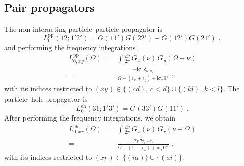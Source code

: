 \documentclass[aip,jcp,reprint,noshowkeys,superscriptaddress]{revtex4-1}
\newcommand{\eps}{\epsilon}
\newcommand{\ii}{\mathrm{i}}
\newcommand{\eh}{\text{eh}}
\newcommand{\pp}{\text{pp}}
\begin{document}
\subsection{Pair propagators}
The non-interacting particle--particle propagator is 
\begin{equation}
	\label{eq:L_pp}
	L^{\pp}_0(12;1'2')=G(11')G(22')-G(12')G(21') \;,
\end{equation}
and performing the frequency integrations,
\begin{equation}
\label{eq:L0pp_omega}
\begin{aligned}
L^{\pp}_{0,xy}(\Omega)
= &
\int\frac{\dd\nu}{2\pi}\,
G_x(\nu)\,G_y(\Omega-\nu)
\\
= &
\frac{-\ii\sigma_x\,\delta_{\sigma_x\sigma_y}}
{\Omega-(\eps_x+\eps_y)+\ii\sigma_x0^+} \;,
\end{aligned}
\end{equation}
with its indices restricted to 
$(xy)\in\big\{(cd),\,c<d\big\}\cup\big\{(kl),\,k<l\big\}$.
The particle--hole propagator is
\begin{equation}
\label{eq:L_eh}
L^{\eh}_0(31;1'3')=G(33')G(11') \;.
\end{equation}
After performing the frequency integrations, we obtain
\begin{equation}
\label{eq:L0eh_omega}
\begin{aligned}
L^{\eh}_{0,xr}(\Omega)
= & 
\int\frac{\dd\nu}{2\pi}\,
G_x(\nu)\,G_r(\nu+\Omega)
\\
= &
\frac{\ii\sigma_r\,\delta_{\sigma_x,-\sigma_r}}
{\Omega-(\eps_r-\eps_x)+\ii\sigma_r0^+} \;,
\end{aligned}
\end{equation}
with its indices restricted to 
$(xr)\in\big\{(ia)\big\}\cup\big\{(ai)\big\}$.
\end{document}

